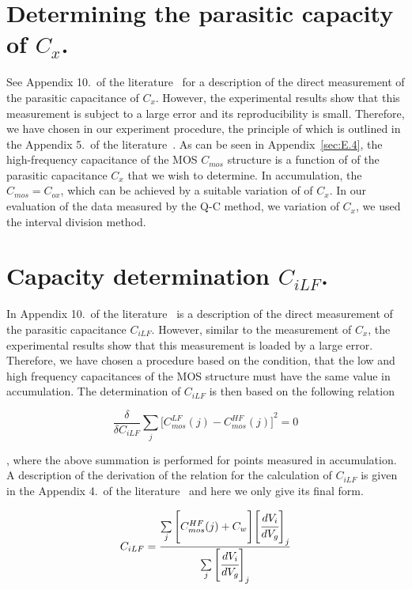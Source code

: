 \section{Determining the parasitic capacity of $C_x$.}\label{sec:E.2}

See Appendix 10.\ of the literature~\cite{App.4} for a description of
the direct measurement of the parasitic capacitance of $C_x$. However,
the experimental results show that this measurement is subject to a
large error and its reproducibility is small. Therefore, we have
chosen in our experiment procedure, the principle of which is outlined
in the Appendix 5.\ of the literature~\cite{App.4}. As can be seen in
Appendix~\ref{sec:E.4}, the high-frequency capacitance of the MOS
$C_{mos}$ structure is a function of of the parasitic capacitance
$C_x$ that we wish to determine. In accumulation, the $C_{mos} =
C_{ox}$, which can be achieved by a suitable variation of of $C_x$. In
our evaluation of the data measured by the Q-C method, we variation of
$C_x$, we used the interval division method.

\section{Capacity determination $C_{iLF}$.}\label{sec:E.3}

In Appendix 10.\ of the literature~\cite{App.4} is a description of
the direct measurement of the parasitic capacitance
$C_{iLF}$. However, similar to the measurement of $C_x$, the
experimental results show that this measurement is loaded by a large
error. Therefore, we have chosen a procedure based on the condition,
that the low and high frequency capacitances of the MOS structure must
have the same value in accumulation. The determination of $C_{iLF}$ is
then based on the following relation

\begin{equation}\label{eq:E.4}
  \frac{\delta}{\delta C_{iLF}} \sum\limits_{j} {\Big[C_{mos}^{LF}(j) - C_{mos}^{HF}(j)\Big]}^2 = 0
\end{equation}

, where the above summation is performed for points measured in
accumulation. A description of the derivation of the relation for the
calculation of $C_{iLF}$ is given in the Appendix 4.\ of the
literature~\cite{App.4} and here we only give its final form.

\begin{equation}\label{eq:E.5}
  C_{iLF} = \frac{\sum\limits_{j}{\Bigg[C_{mos}^{HF}(j)+C_{w}\Bigg]}{\Bigg[\cfrac{dV_i}{dV_g}\Bigg]}_j}{\sum\limits_{j}{\Bigg[\cfrac{dV_i}{dV_g}\Bigg]}_j}
\end{equation}

